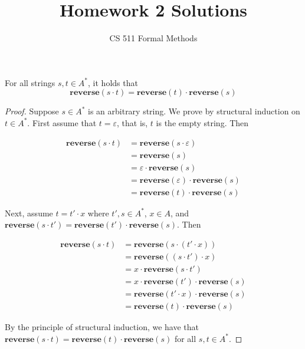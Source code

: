 \documentclass[12pt,leqno,fleqn]{article}
\newenvironment{exercise}[2][Exercise]{\begin{trivlist}
\item[\hskip \labelsep {\bfseries #1}\hskip \labelsep {\bfseries #2.}]}{\end{trivlist}}
\begin{document}
 
\title{Homework 2 Solutions}
\author{CS 511 Formal Methods}

\maketitle

\begin{exercise}{1:  Lecture Slides 06, Page 9}
    For all strings $s, t \in A^*$, it holds that $$\textbf{reverse}(s \cdot t) = \textbf{reverse}(t) \cdot \textbf{reverse}(s)$$
\end{exercise}

\begin{proof}
    Suppose $s \in A^*$ is an arbitrary string.  We prove by structural induction on $t \in A^*$.  First assume that $t = \varepsilon$, that is, $t$ is the empty string.  Then 

    \begin{equation*}
        \begin{aligned}
            \textbf{reverse}(s \cdot t) &= \textbf{reverse}(s \cdot \varepsilon) \\
            &= \textbf{reverse}(s) \\
            &= \varepsilon \cdot \textbf{reverse}(s) \\
            &= \textbf{reverse}(\varepsilon) \cdot \textbf{reverse}(s) \\
            &= \textbf{reverse}(t) \cdot \textbf{reverse}(s) 
        \end{aligned}
    \end{equation*}

    Next, assume $t = t' \cdot x$ where $t', s \in A^*$, $x \in A$, and $\textbf{reverse}(s \cdot t') = \textbf{reverse}(t') \cdot \textbf{reverse}(s)$.  Then 

    \begin{equation*}
        \begin{aligned}
            \textbf{reverse}(s \cdot t) &= \textbf{reverse}(s \cdot (t' \cdot x)) \\
            &= \textbf{reverse}((s \cdot t') \cdot x) \\ 
            &= x \cdot \textbf{reverse}(s \cdot t') \\
            &= x \cdot \textbf{reverse}(t') \cdot \textbf{reverse}(s) \\
            &= \textbf{reverse}(t' \cdot x) \cdot \textbf{reverse}(s) \\ 
            &= \textbf{reverse}(t) \cdot \textbf{reverse}(s) 
        \end{aligned}
    \end{equation*}

    By the principle of structural induction, we have that $\textbf{reverse}(s \cdot t) = \textbf{reverse}(t) \cdot \textbf{reverse}(s)$ for all $s, t \in A^*$.  
\end{proof}
\end{document}
